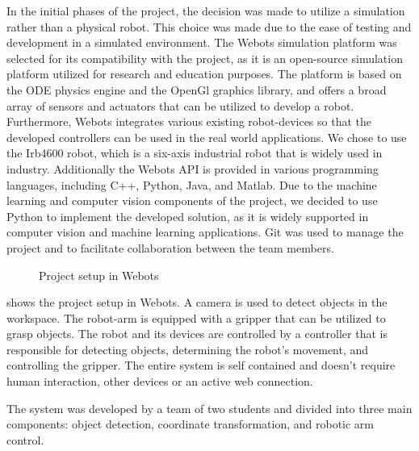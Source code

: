In the initial phases of the project, the decision was made to utilize a simulation rather than a physical robot. This choice was made due to the ease of testing and development in a simulated environment. The Webots simulation platform was selected for its compatibility with the project, as it is an open-source simulation platform utilized for research and education purposes. The platform is based on the ODE physics engine and the OpenGl graphics library, and offers a broad array of sensors and actuators that can be utilized to develop a robot. Furthermore, Webots integrates various existing robot-devices so that the developed controllers can be used in the real world applications. We chose to use the Irb4600 robot, which is a six-axis industrial robot that is widely used in industry. Additionally the Webots API is provided in various programming languages, including C++, Python, Java, and Matlab. Due to the machine learning and computer vision components of the project, we decided to use Python to implement the developed solution, as it is widely supported in computer vision and machine learning applications. Git was used to manage the project and to facilitate collaboration between the team members.

\begin{figure}[!h]
    \centering
    \caption{Project setup in Webots }
    \label{fig:project_setup}
\end{figure}

 shows the project setup in Webots. A camera is used to detect objects in the workspace. The robot-arm is equipped with a gripper that can be utilized to grasp objects. The robot and its devices are controlled by a controller that is responsible for detecting objects, determining the robot's movement, and controlling the gripper. The entire system is self contained and doesn't require human interaction, other devices or an active web connection.

The system was developed by a team of two students and divided into three main components: object detection, coordinate transformation, and robotic arm control. 

